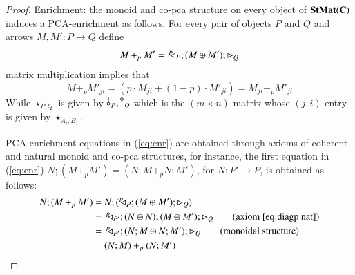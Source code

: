 \begin{proof}
Enrichment: the monoid and co-pca structure on every object of $\mathbf{StMat}(\mathbf{C})$ induces a PCA-enrichment as follows. For every pair of objects $P$ and $Q$ and arrows $M,M'\colon P\to Q$ define 
\[M+_p M' =\, ^p\!\! \lhd_{P};(M\oplus M');\rhd_{Q}\] 
matrix multiplication implies that
\[M+_p M'_{ji} = (p\cdot M_{ji} + (1-p)\cdot M'_{ji})= M_{ji}+_p M'_{ji}\]
While $\star_{P,Q}$ is given by $\,\bangp{P};\cobang{Q}$ which is the $(m\times n)$ matrix whose $(j,i)$-entry is given by $\star_{A_i,B_j}$.

PCA-enrichment equations in (\ref{eq:enr}) are obtained through axioms of coherent and natural monoid and co-pca structures, for instance, the first equation in (\ref{eq:enr}) $N;(M+_pM')= (N;M +_p N;M')$, for $N\colon P'\to P$, is obtained as follows:
\begin{align}
    N;(M+_pM') &= N;(\diagp{P};(M\piu M');\codiag{Q}) \tag*{}\\
    &=\, \diagp{P'};(N\piu N);(M\piu M');\codiag{Q} \tag{axiom \ref{eq:diagp nat}}\\
    &=\, \diagp{P'};(N;M\piu N;M');\codiag{Q} \tag{monoidal structure}\\
    &= (N;M) +_p (N;M') \tag*{}
\end{align}
\end{proof}
\fi



